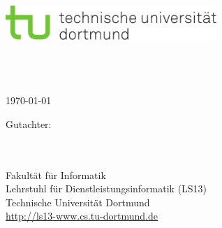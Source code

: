 \begin{titlepage}
\vspace*{-2cm}
\newlength{\links}
\setlength{\links}{-1.5cm}
\selectfont
\LARGE

\hspace*{\links}
\begin{minipage}{12.5cm}
\includegraphics[width=8cm]{bilder/tud_logo_cmyk}
\end{minipage}

\vspace*{1.8cm}

\hspace*{-0.6cm}
\begin{minipage}[t][7.5cm][c]{7.5cm}
\large
\begin{center}

{\Large \arbeitstyp} \\
\vspace*{1cm}
\textbf{\titel } \\
\vspace*{1cm}
\autorname\\
\today
\end{center}
\end{minipage}


\vfill

\hspace*{\links}
\begin{minipage}[b]{8cm}
\normalsize
\raggedright
Gutachter: \\
\erstgutachter \\
\zweitgutachter \\
\vspace{1cm}
\normalsize
\raggedright
Fakultät für Informatik\\
Lehrstuhl für Dienstleistungsinformatik (LS13)\\
Technische Universität Dortmund \\
\url{http://ls13-www.cs.tu-dortmund.de}
\end{minipage}
\hspace{2cm}
\begin{minipage}[b]{5cm}
	\normalsize
	\raggedleft
	\kooperation
\end{minipage}

\end{titlepage}
